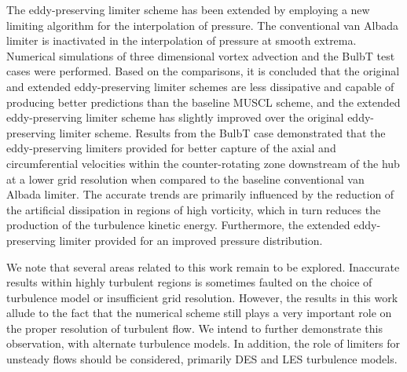 The eddy-preserving limiter scheme has been extended by employing a new limiting algorithm for the interpolation of pressure. The conventional van Albada limiter is inactivated in the interpolation of pressure at smooth extrema. Numerical simulations of three dimensional vortex advection and the BulbT test cases were performed. Based on the comparisons, it is concluded that the original and extended eddy-preserving limiter schemes are less dissipative and capable of producing better predictions than the baseline MUSCL scheme, and the extended eddy-preserving limiter scheme has slightly improved over the original eddy-preserving limiter scheme. Results from the BulbT case demonstrated that the eddy-preserving limiters provided for better capture of the axial and circumferential velocities within the counter-rotating zone downstream of the hub at a lower grid resolution when compared to the baseline conventional van Albada limiter. The accurate trends are primarily influenced by the reduction of the artificial dissipation in regions of high vorticity, which in turn reduces the production of the turbulence kinetic energy. Furthermore, the extended eddy-preserving limiter provided for an improved pressure distribution.

We note that several areas related to this work remain to be explored. Inaccurate results within highly turbulent regions is sometimes faulted on the choice of turbulence model or insufficient grid resolution.  However, the results in this work allude to the fact that the numerical scheme still plays a very important role on the proper resolution of turbulent flow. We intend to further demonstrate this observation, with alternate turbulence models. In addition, the role of limiters for unsteady flows should be considered, primarily DES and LES turbulence models.




